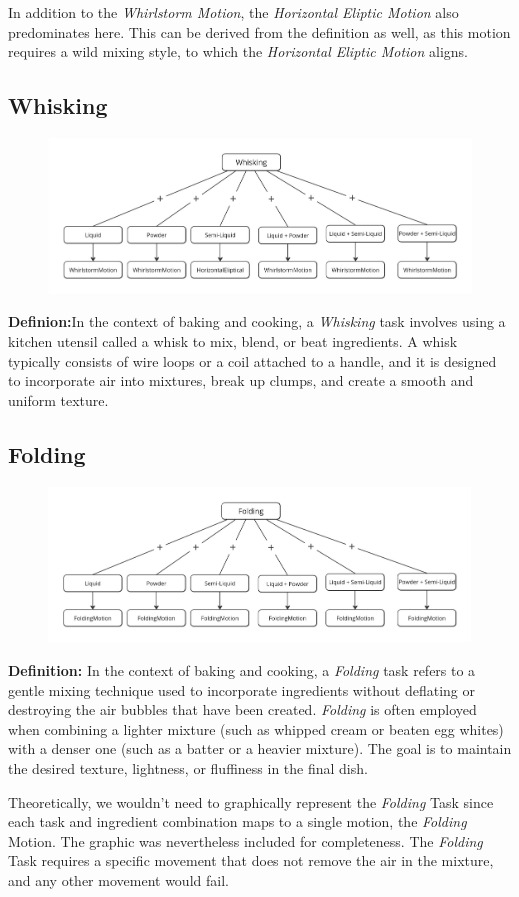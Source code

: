 In addition to the \textit{Whirlstorm Motion}, the \textit{Horizontal Eliptic Motion} also predominates here. This can be derived from the definition as well, as this motion requires a wild mixing style, to which the \textit{Horizontal Eliptic Motion} aligns.
\subsection{Whisking}
\begin{figure}[H]
    \includegraphics[scale=0.25]{Graphics/WhiskingDecisionTree.jpg}
    \end{figure}
\textbf{Definion:}In the context of baking and cooking, a \textit{Whisking} task involves using a kitchen utensil called a whisk to mix, blend, or beat ingredients. A whisk typically consists of wire loops or a coil attached to a handle, and it is designed to incorporate air into mixtures, break up clumps, and create a smooth and uniform texture.

\subsection{Folding}
\begin{figure}[H]
    \includegraphics[scale=0.25]{Graphics/FoldingDecisionTree.jpg}
    \end{figure}
\textbf{Definition:}
In the context of baking and cooking, a \textit{Folding} task refers to a gentle mixing technique used to incorporate ingredients without deflating or destroying the air bubbles that have been created. \textit{Folding} is often employed when combining a lighter mixture (such as whipped cream or beaten egg whites) with a denser one (such as a batter or a heavier mixture). The goal is to maintain the desired texture, lightness, or fluffiness in the final dish.

Theoretically, we wouldn't need to graphically represent the \textit{Folding} Task since each task and ingredient combination maps to a single motion, the \textit{Folding} Motion. The graphic was nevertheless included for completeness. The \textit{Folding} Task requires a specific movement that does not remove the air in the mixture, and any other movement would fail.
